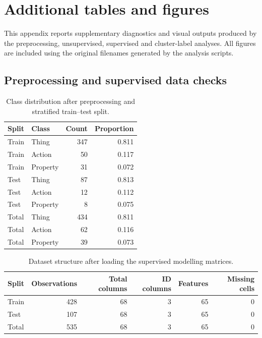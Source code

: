 
\section{Additional tables and figures}
\label{app:additional-tables-figures}

This appendix reports supplementary diagnostics and visual outputs produced by the preprocessing, unsupervised, supervised and cluster-label analyses. All figures are included using the original filenames generated by the analysis scripts.

\subsection{Preprocessing and supervised data checks}
\label{app:preprocessing-data-checks}

\begin{table}[htbp]
\centering
\caption{Class distribution after preprocessing and stratified train--test split.}
\label{tab:app-class-distribution}
\begin{tabular}{llrr}
\toprule
Split & Class & Count & Proportion \\
\midrule
Train & Thing & 347 & 0.811 \\
Train & Action & 50 & 0.117 \\
Train & Property & 31 & 0.072 \\
Test & Thing & 87 & 0.813 \\
Test & Action & 12 & 0.112 \\
Test & Property & 8 & 0.075 \\
Total & Thing & 434 & 0.811 \\
Total & Action & 62 & 0.116 \\
Total & Property & 39 & 0.073 \\
\bottomrule
\end{tabular}
\end{table}

\begin{table}[htbp]
\centering
\caption{Dataset structure after loading the supervised modelling matrices.}
\label{tab:app-dataset-shape-summary}
\begin{tabular}{lrrrrr}
\toprule
Split & Observations & Total columns & ID columns & Features & Missing cells \\
\midrule
Train & 428 & 68 & 3 & 65 & 0 \\
Test & 107 & 68 & 3 & 65 & 0 \\
Total & 535 & 68 & 3 & 65 & 0 \\
\bottomrule
\end{tabular}
\end{table}

